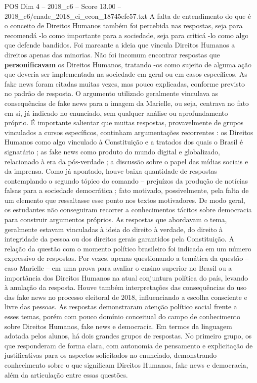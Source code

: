 \begin{textsample}{POS Dim 4 – 2018\_c6 – Score 13.00 – 2018\_c6/enade\_2018\_ci\_econ\_18745efc57.txt}
A falta de entendimento do que é o conceito de Direitos Humanos também foi percebida nas respostas, seja para recomendá -lo como importante para a sociedade, seja para criticá -lo como algo que defende bandidos.
Foi marcante a ideia que vincula Direitos Humanos a direitos apenas das minorias.
Não foi incomum encontrar respostas que \textbf{personificavam} os Direitos Humanos, tratando -os como sujeito de alguma ação que deveria ser implementada na sociedade em geral ou em casos específicos.
As fake news foram citadas muitas vezes, mas pouco explicadas, conforme previsto no padrão de resposta.
O argumento utilizado geralmente vinculava as consequências de fake news para a imagem da Marielle, ou seja, centrava no fato em si, já indicado no enunciado, sem qualquer análise ou aprofundamento próprio.
É importante salientar que muitas respostas, provavelmente de grupos vinculados a cursos específicos, continham argumentações recorrentes : os Direitos Humanos como algo vinculado à Constituição e a tratados dos quais o Brasil é signatário ; as fake news como produto do mundo digital e globalizado, relacionado à era da pós-verdade ; a discussão sobre o papel das mídias sociais e da imprensa.
Como já apontado, houve baixa quantidade de respostas contemplando o segundo tópico do comando – prejuízos da produção de notícias falsas para a sociedade democrática ; fato motivado, possivelmente, pela falta de um elemento que ressaltasse esse ponto nos textos motivadores.
De modo geral, os estudantes não conseguiram recorrer a conhecimentos tácitos sobre democracia para construir argumentos próprios.
As respostas que abordavam o tema, geralmente estavam vinculadas à ideia do direito à verdade, do direito à integridade da pessoa ou dos direitos gerais garantidos pela Constituição.
A relação da questão com o momento político brasileiro foi indicada em um número expressivo de respostas.
Por vezes, apenas questionando a temática da questão – caso Marielle – em uma prova para avaliar o ensino superior no Brasil ou a importância dos Direitos Humanos na atual conjuntura política do país, levando à anulação da resposta.
Houve também interpretações das consequências do uso das fake news no processo eleitoral de 2018, influenciando a escolha consciente e livre das pessoas.
As respostas demonstraram atenção político social frente a esses temas, porém com pouco domínio conceitual do campo de conhecimento sobre Direitos Humanos, fake news e democracia.
Em termos da linguagem adotada pelos alunos, há dois grandes grupos de respostas.
No primeiro grupo, os que responderam de forma clara, com autonomia de pensamento e explicitação de justificativas para os aspectos solicitados no enunciado, demonstrando conhecimento sobre o que significam Direitos Humanos, fake news e democracia, além da articulação entre essas questões.

\end{textsample}
